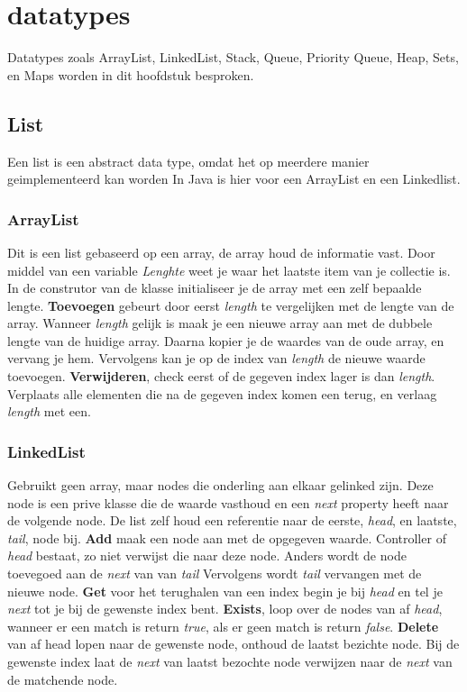 \section{datatypes}
Datatypes zoals ArrayList, LinkedList, Stack, Queue, Priority Queue, Heap, Sets, en Maps worden in dit hoofdstuk besproken.

\subsection{List}
Een list is een abstract data type, omdat het op meerdere manier geimplementeerd kan worden
In Java is hier voor een ArrayList en een Linkedlist.

\subsubsection{ArrayList}
Dit is een list gebaseerd op een array, de array houd de informatie vast.
Door middel van een variable \textit{Lenghte} weet je waar het laatste item van je collectie is.
In de construtor van de klasse initialiseer je de array met een zelf bepaalde lengte.
\textbf{Toevoegen} gebeurt door eerst \textit{length} te vergelijken met de lengte van de array.
Wanneer \textit{length} gelijk is maak je een nieuwe array aan met de dubbele lengte van de huidige array.
Daarna kopier je de waardes van de oude array, en vervang je hem.
Vervolgens kan je op de index van \textit{length} de nieuwe waarde toevoegen.
\textbf{Verwijderen}, check eerst of de gegeven index lager is dan \textit{length}.
Verplaats alle elementen die na de gegeven index komen een terug, en verlaag \textit{length} met een.

\subsubsection{LinkedList}
Gebruikt geen array, maar nodes die onderling aan elkaar gelinked zijn.
Deze node is een prive klasse die de waarde vasthoud en een \textit{next} property heeft naar de volgende node.
De list zelf houd een referentie naar de eerste, \textit{head}, en laatste, \textit{tail}, node bij.
\textbf{Add} maak een node aan met de opgegeven waarde.
Controller of \textit{head} bestaat, zo niet verwijst die naar deze node.
Anders wordt de node toevegoed aan de \textit{next} van van \textit{tail}
Vervolgens wordt \textit{tail} vervangen met de nieuwe node.
\textbf{Get} voor het terughalen van een index begin je bij \textit{head} en tel je \textit{next} tot je bij de gewenste index bent.
\textbf{Exists}, loop over de nodes van af \textit{head}, wanneer er een match is return \textit{true}, als er geen match is return \textit{false}.
\textbf{Delete} van af head lopen naar de gewenste node, onthoud de laatst bezichte node. Bij de gewenste index laat de \textit{next} van laatst bezochte node verwijzen naar de \textit{next} van de matchende node.

